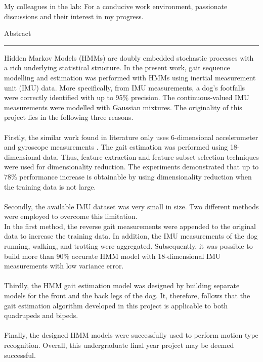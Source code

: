 \documentclass[a4paper,12pt]{report}
\begin{document}
{My colleagues in the lab: For a conducive work environment, passionate discussions and their interest in my progress.
\newpage

{\Large Abstract}\\
\hrule

Hidden Markov Models (HMMs) are doubly embedded stochastic processes with a rich underlying statistical structure. 
In the present work, gait sequence modelling and estimation was performed with HMMs using inertial measurement unit (IMU) data. More specifically, from IMU measurements, a dog's footfalls were correctly identified with up to 95\% precision. The continuous-valued IMU measurements were modelled with Gaussian mixtures. The originality of this project lies in the following three reasons. \\\\
Firstly, the similar work found in literature only uses 6-dimensional accelerometer and gyroscope measurements \cite{ches2012} \cite{cont2013}. The gait estimation was performed using 18-dimensional data. Thus, feature extraction and feature subset selection techniques were used for dimensionality reduction. The experiments demonstrated that up to 78\% performance increase is obtainable by using dimensionality reduction when the training data is not large.\\\\
Secondly, the available IMU dataset was very small in size. Two different methods were employed to overcome this limitation. \\In the first method,
the reverse gait measurements were appended to the original data to increase the training data. In addition, the IMU measurements of the dog running, walking, and trotting were aggregated. 
Subsequently, it was possible to build more than 90\% accurate HMM model with 18-dimensional IMU measurements with low variance error.\\\\
Thirdly, the HMM gait estimation model was designed by building separate models for the front and the back legs of the dog. It, therefore, follows that the gait estimation algorithm developed in this project is applicable to both quadrupeds and bipeds.\\\\
Finally, the designed HMM models were successfully used to perform motion type recognition. Overall, this undergraduate final year project may be deemed successful.
\newpage
\tableofcontents

}
\end{document}
